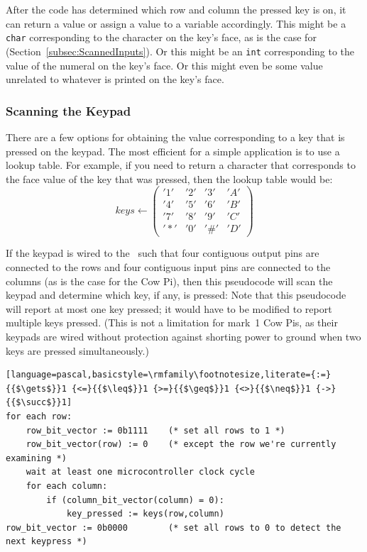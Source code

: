 After the code has determined which row and column the pressed key is on, it can return a value or assign a value to a variable accordingly.
This might be a \lstinline{char} corresponding to the character on the key's face, as is the case for  (Section~\ref{subsec:ScannedInputs}).
Or this might be an \lstinline{int} corresponding to the value of the numeral on the key's face.
Or this might even be some value unrelated to whatever is printed on the key's face.

\subsubsection{Scanning the Keypad}

There are a few options for obtaining the value corresponding to a key that is pressed on the keypad.
The most efficient for a simple application is to use a lookup table.
For example, if you need to return a character that corresponds to the face value of the key that was pressed, then the lookup table would be:
\[
    keys \gets
    \left(\begin{array}{cccc}
              '1' & '2' & '3' & 'A' \\
              '4' & '5' & '6' & 'B' \\
              '7' & '8' & '9' & 'C' \\
              '*' & '0' & '\#' & 'D'
    \end{array}\right)
\]

If the keypad is wired to the \mcuboard\ such that four contiguous output pins are connected to the rows and four contiguous input pins are connected to the columns (as is the case for the Cow Pi), then this pseudocode will scan the keypad and determine which key, if any, is pressed:
Note that this pseudocode will report at most one key pressed;
it would have to be modified to report multiple keys pressed.
(This is not a limitation for mark~1 Cow Pis, as their keypads are wired without protection against shorting power to ground when two keys are pressed simultaneously.)

\begin{lstlisting}[language=pascal,basicstyle=\rmfamily\footnotesize,literate={:=}{{$\gets$}}1 {<=}{{$\leq$}}1 {>=}{{$\geq$}}1 {<>}{{$\neq$}}1 {->}{{$\succ$}}1]
for each row:
    row_bit_vector := 0b1111    (* set all rows to 1 *)
    row_bit_vector(row) := 0    (* except the row we're currently examining *)
    wait at least one microcontroller clock cycle
    for each column:
        if (column_bit_vector(column) = 0):
            key_pressed := keys(row,column)
row_bit_vector := 0b0000        (* set all rows to 0 to detect the next keypress *)
\end{lstlisting}


